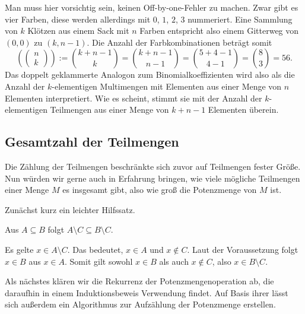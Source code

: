 Man muss hier vorsichtig sein, keinen Off-by-one-Fehler zu machen.
Zwar gibt es vier Farben, diese werden allerdings mit $0$, $1$, $2$, $3$
nummeriert. Eine Sammlung von $k$ Klötzen aus einem Sack mit $n$ Farben
entspricht also einem Gitterweg von $(0,0)$ zu $(k,n-1)$. Die Anzahl
der Farbkombinationen beträgt somit
\[\left(\!\left(\begin{matrix}n\\ k\end{matrix}\right)\!\right) :=
\binom{k+n-1}{k} = \binom{k+n-1}{n-1} = \binom{5+4-1}{4-1} = \binom{8}{3} = 56.\]
Das doppelt geklammerte Analogon zum Binomialkoeffizienten wird also als
die Anzahl der $k$-elementigen Multimengen mit Elementen aus einer Menge
von $n$ Elementen interpretiert. Wie es scheint, stimmt sie mit der Anzahl
der $k$-elementigen Teilmengen aus einer Menge von $k+n-1$ Elementen
überein.

\subsection{Gesamtzahl der Teilmengen}

Die Zählung der Teilmengen beschränkte sich zuvor auf Teilmengen fester
Größe. Nun würden wir gerne auch in Erfahrung bringen, wie viele mögliche
Teilmengen einer Menge $M$ es insgesamt gibt, also wie groß die
Potenzmenge von $M$ ist.

Zunächst kurz ein leichter Hilfssatz.

\begin{Satz}\label{ohne-ist-monoton}
Aus $A\subseteq B$ folgt $A\setminus C\subseteq B\setminus C$.
\end{Satz}
\begin{Beweis}
Es gelte $x\in A\setminus C$. Das bedeutet, $x\in A$ und $x\notin C$.
Laut der Voraussetzung folgt $x\in B$ aus $x\in A$. Somit gilt sowohl
$x\in B$ als auch $x\notin C$, also $x\in B\setminus C$.\,\qedsymbol
\end{Beweis}

\noindent
Als nächstes klären wir die Rekurrenz der Potenzmengenoperation ab,
die daraufhin in einem Induktionsbeweis Verwendung findet. Auf Basis
ihrer lässt sich außerdem ein Algorithmus zur Aufzählung der Potenzmenge
erstellen.

